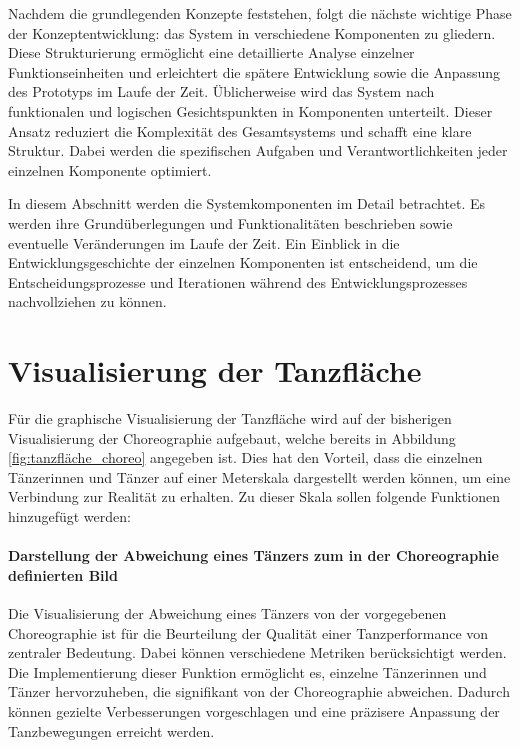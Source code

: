 \documentclass[
  ngerman,
  a4paper,  %
  twoside,  %
  bibliography=totoc,
  headsepline,
  cleardoublepage=empty,
  parskip=half,
  draft=false
]{scrbook}
\begin{document}
Nachdem die grundlegenden Konzepte feststehen, folgt die nächste wichtige Phase der Konzeptentwicklung: das System in verschiedene Komponenten zu gliedern. Diese Strukturierung ermöglicht eine detaillierte Analyse einzelner Funktionseinheiten und erleichtert die spätere Entwicklung sowie die Anpassung des Prototyps im Laufe der Zeit. Üblicherweise wird das System nach funktionalen und logischen Gesichtspunkten in Komponenten unterteilt. Dieser Ansatz reduziert die Komplexität des Gesamtsystems und schafft eine klare Struktur. Dabei werden die spezifischen Aufgaben und Verantwortlichkeiten jeder einzelnen Komponente optimiert.

In diesem Abschnitt werden die Systemkomponenten im Detail betrachtet. Es werden ihre Grundüberlegungen und Funktionalitäten beschrieben sowie eventuelle Veränderungen im Laufe der Zeit. Ein Einblick in die Entwicklungsgeschichte der einzelnen Komponenten ist entscheidend, um die Entscheidungsprozesse und Iterationen während des Entwicklungsprozesses nachvollziehen zu können.

\section{Visualisierung der Tanzfläche}
Für die graphische Visualisierung der Tanzfläche wird auf der bisherigen Visualisierung der Choreographie aufgebaut, welche bereits in Abbildung \ref{fig:tanzfläche_choreo} angegeben ist. Dies hat den Vorteil, dass die einzelnen Tänzerinnen und Tänzer auf einer Meterskala dargestellt werden können, um eine Verbindung zur Realität zu erhalten. Zu dieser Skala sollen folgende Funktionen hinzugefügt werden:
\paragraph{Darstellung der Abweichung eines Tänzers zum in der Choreographie definierten Bild}
Die Visualisierung der Abweichung eines Tänzers von der vorgegebenen Choreographie ist für die Beurteilung der Qualität einer Tanzperformance von zentraler Bedeutung. Dabei können verschiedene Metriken berücksichtigt werden. Die Implementierung dieser Funktion ermöglicht es, einzelne Tänzerinnen und Tänzer hervorzuheben, die signifikant von der Choreographie abweichen. Dadurch können gezielte Verbesserungen vorgeschlagen und eine präzisere Anpassung der Tanzbewegungen erreicht werden.
\end{document}
